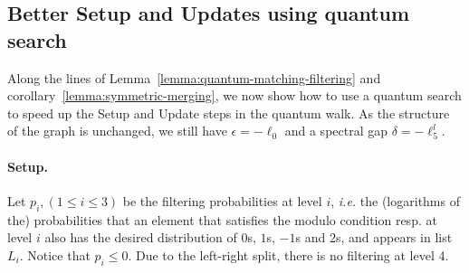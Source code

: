 %
%



\subsection{Better Setup and Updates using quantum search}\label{subsection:update-qsearch}

Along the lines of Lemma~\ref{lemma:quantum-matching-filtering} and corollary~\ref{lemma:symmetric-merging}, we now show how to use a quantum search to speed up the \textsf{Setup} and \textsf{Update} steps in the quantum walk. As the structure of the graph is unchanged, we still have $\epsilon = - \ell_0$ and a spectral gap $\delta = - \ell_5^l$.

\paragraph{Setup.} 
Let $p_i, (1 \leq i \leq 3)$ be the filtering probabilities at level $i$, \emph{i.e.} the (logarithms of the) probabilities that an element that satisfies the modulo condition resp. at level $i$ also has the desired distribution of $0$s, $1$s, $-1$s and $2$s, and appears in list $L_i$. Notice that $p_i \leq 0$. Due to the left-right split, there is no filtering at level 4.

